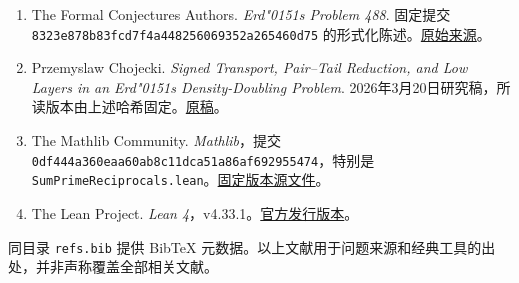 \documentclass[
  11pt,
]{article}
\providecommand{\tightlist}{%
  \setlength{\itemsep}{0pt}\setlength{\parskip}{0pt}}
\newcommand{\odoubleacute}{{\accentfont\char"0151}}
\begin{document}
\begin{enumerate}\raggedright
\def\labelenumi{\arabic{enumi}.}
\tightlist
\item
  The Formal Conjectures Authors. \emph{Erd\texorpdfstring{\odoubleacute}{o}s Problem 488}. 固定提交
  \texttt{8323e878b8\allowbreak{}3fcd7f4a44\allowbreak{}8256069352\allowbreak{}a265460d75}
  的形式化陈述。\href{https://github.com/google-deepmind/formal-conjectures/blob/8323e878b83fcd7f4a448256069352a265460d75/FormalConjectures/ErdosProblems/488.lean}{原始来源}。
\item
  Przemyslaw Chojecki. \emph{Signed Transport, Pair--Tail Reduction, and
  Low Layers in an Erd\texorpdfstring{\odoubleacute}{o}s Density-Doubling Problem}.
  2026年3月20日研究稿，所读版本由上述哈希固定。\href{https://www.ulam.ai/research/erdos488.pdf}{原稿}。
\item
  The Mathlib Community. \emph{Mathlib}，提交
  \texttt{0df444a360\allowbreak{}eaa60ab8c1\allowbreak{}1dca51a86a\allowbreak{}f692955474}，特别是
  \texttt{SumPrimeReciprocals.\allowbreak{}lean}。\href{https://github.com/leanprover-community/mathlib4/blob/0df444a360eaa60ab8c11dca51a86af692955474/Mathlib/NumberTheory/SumPrimeReciprocals.lean}{固定版本源文件}。
\item
  The Lean Project. \emph{Lean
  4}，v4.33.1。\href{https://github.com/leanprover/lean4/releases/tag/v4.33.1}{官方发行版本}。
\end{enumerate}

同目录 \texttt{refs.\allowbreak{}bib} 提供 BibTeX
元数据。以上文献用于问题来源和经典工具的出处，并非声称覆盖全部相关文献。
\end{document}
